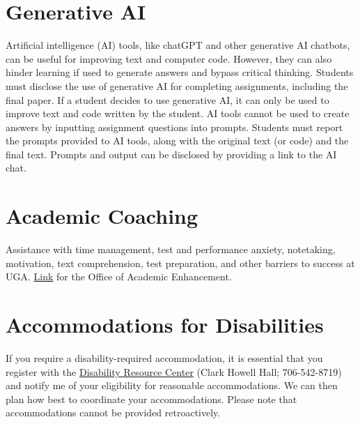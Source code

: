 \documentclass[12pt]{article}
\begin{document}
\section*{\normalsize Generative AI}
\vspace{-4mm}

Artificial intelligence (AI) tools, like chatGPT and other generative AI
chatbots, can be useful for improving text and computer code. However,
they can also hinder learning if used to generate answers and bypass
critical thinking. Students must disclose the use of generative AI for
completing assignments, including the final paper. If a
student decides to use generative AI, it can only be used to improve
text and code written by the student. AI tools cannot be used to create
answers by inputting assignment questions into prompts. Students
must report the prompts provided to AI tools, along with the original
text (or code) and the final text. Prompts and output can be disclosed
by providing a link to the AI chat.



\section*{\normalsize Academic Coaching}
\vspace{-4mm}

Assistance with time management, test and performance anxiety,
notetaking, motivation, text comprehension, test preparation, and
other barriers to success at
UGA. \href{https://dae.uga.edu/services/academic-coaching/}{\color{blue}
  Link} for the Office of Academic Enhancement. 

\section*{\normalsize Accommodations for Disabilities}
\vspace{-4mm}

If you require a disability-required accommodation, it is essential
that you register with the \href{https://drc.uga.edu}{Disability Resource Center} (Clark Howell
Hall; 706-542-8719)
and notify me of your eligibility for reasonable accommodations. We
can then plan how best to coordinate your accommodations. Please note
that accommodations cannot be provided retroactively.
\end{document}
